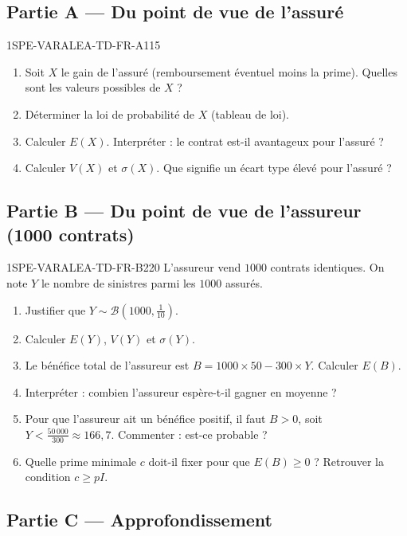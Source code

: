 \subsection*{Partie A — Du point de vue de l'assuré}

\begin{exercice}{1SPE-VARALEA-TD-FR-A}{1}{15}
\begin{enumerate}
  \item Soit $X$ le gain de l'assuré (remboursement éventuel moins la prime). Quelles sont les valeurs possibles de $X$ ?
  \item Déterminer la loi de probabilité de $X$ (tableau de loi).
  \item Calculer $E(X)$. Interpréter : le contrat est-il avantageux pour l'assuré ?
  \item Calculer $V(X)$ et $\sigma(X)$. Que signifie un écart type élevé pour l'assuré ?
\end{enumerate}
\end{exercice}

\subsection*{Partie B — Du point de vue de l'assureur (1000 contrats)}

\begin{exercice}{1SPE-VARALEA-TD-FR-B}{2}{20}
L'assureur vend $1000$ contrats identiques. On note $Y$ le nombre de sinistres parmi les $1000$ assurés.
\begin{enumerate}
  \item Justifier que $Y \sim \mathcal{B}(1000, \frac{1}{10})$.
  \item Calculer $E(Y)$, $V(Y)$ et $\sigma(Y)$.
  \item Le bénéfice total de l'assureur est $B = 1000 \times 50 - 300 \times Y$. Calculer $E(B)$.
  \item Interpréter : combien l'assureur espère-t-il gagner en moyenne ?
  \item Pour que l'assureur ait un bénéfice positif, il faut $B > 0$, soit $Y < \frac{50\,000}{300} \approx 166{,}7$. Commenter : est-ce probable ?
  \item Quelle prime minimale $c$ doit-il fixer pour que $E(B) \geq 0$ ? Retrouver la condition $c \geq pI$.
\end{enumerate}
\end{exercice}

\subsection*{Partie C — Approfondissement}


